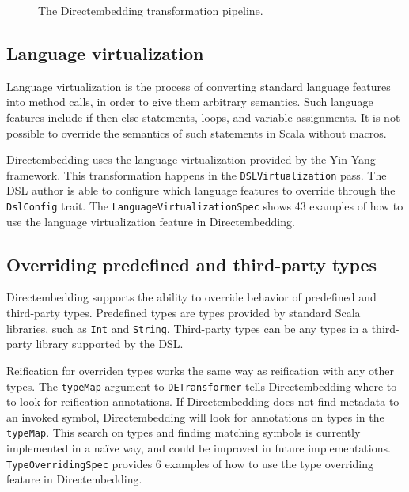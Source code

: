 \begin{figure}
    \centering
    \caption{The Directembedding transformation pipeline.}\label{fig:pipeline}
\end{figure}

\subsection{Language virtualization} %
\label{sub:LanguageVirtualization}
Language virtualization is the process of converting standard language features into method calls, in order to give them arbitrary semantics.
Such language features include if-then-else statements, loops, and variable assignments.
It is not possible to override the semantics of such statements in Scala without macros.

Directembedding uses the language virtualization provided by the Yin-Yang~\autocite{jovanovic_yin-yang:_2014} framework.
This transformation happens in the \texttt{DSLVirtualization} pass.
The DSL author is able to configure which language features to override through the \texttt{DslConfig} trait.
The \texttt{LanguageVirtualizationSpec} shows 43 examples of how to use the language virtualization feature in Directembedding.

\subsection{Overriding predefined and third-party types} %
\label{sub:Overridingpredefinedandthirdpartytypes}
Directembedding supports the ability to override behavior of predefined and third-party types.
Predefined types are types provided by standard Scala libraries, such as \texttt{Int} and \texttt{String}.
Third-party types can be any types in a third-party library supported by the DSL.\

Reification for overriden types works the same way as reification with any other types.
The \texttt{typeMap} argument to \texttt{DETransformer} tells Directembedding where to to look for reification annotations.
If Directembedding does not find metadata to an invoked symbol, Directembedding will look for annotations on types in the \texttt{typeMap}.
This search on types and finding matching symbols is currently implemented in a naïve way, and could be improved in future implementations.
\texttt{TypeOverridingSpec} provides 6 examples of how to use the type overriding feature in Directembedding.

